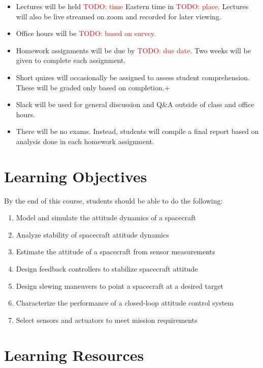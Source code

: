 \documentclass[11pt,letterpaper]{article}
\newcommand{\todo}[1]{\textcolor{red}{TODO: #1}}
\begin{document}
\begin{itemize}
	\item Lectures will be held \todo{time} Eastern time in \todo{place}. Lectures will also be live streamed on zoom and recorded for later viewing.
	\item Office hours will be \todo{based on survey}.
	\item Homework assignments will be due by \todo{due date}. Two weeks will be given to complete each assignment.
	\item Short quizes will occasionally be assigned to assess student comprehension. These will be graded only based on completion.+
	\item Slack will be used for general discussion and Q\&A outside of class and office hours.
	\item There will be no exams. Instead, students will compile a final report based on analysis done in each homework assignment.
\end{itemize}

\newpage 
\section*{Learning Objectives}
By the end of this course, students should be able to do the following:
\begin{enumerate}
	\item Model and simulate the attitude dynamics of a spacecraft
	\item Analyze stability of spacecraft attitude dynamics
	\item Estimate the attitude of a spacecraft from sensor measurements
	\item Design feedback controllers to stabilize spacecraft attitude
	\item Design slewing maneuvers to point a spacecraft at a desired target
	\item Characterize the performance of a closed-loop attitude control system
	\item Select sensors and actuators to meet mission requirements
\end{enumerate}

\section*{Learning Resources}
\end{document}
